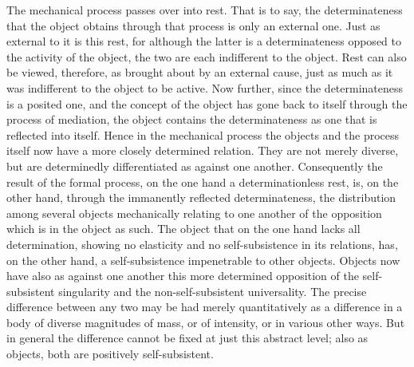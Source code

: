 The mechanical process passes over into rest.
That is to say, the determinateness that the object obtains
through that process is only an external one.
Just as external to it is this rest,
for although the latter is a determinateness
opposed to the activity of the object,
the two are each indifferent to the object.
Rest can also be viewed, therefore,
as brought about by an external cause,
just as much as it was indifferent to
the object to be active.
Now further, since the determinateness is a posited one,
and the concept of the object has gone back to itself
through the process of mediation,
the object contains the determinateness
as one that is reflected into itself.
Hence in the mechanical process the objects
and the process itself now
have a more closely determined relation.
They are not merely diverse,
but are determinedly differentiated as against one another.
Consequently the result of the formal process,
on the one hand a determinationless rest, is,
on the other hand, through
the immanently reflected determinateness,
the distribution among several objects
mechanically relating to one another
of the opposition which is in the object as such.
The object that on the one hand lacks all determination,
showing no elasticity and no self-subsistence in its relations,
has, on the other hand, a self-subsistence
impenetrable to other objects.
Objects now have also as against one another
this more determined opposition of
the self-subsistent singularity
and the non-self-subsistent universality.
The precise difference between any two may be
had merely quantitatively as a difference in
a body of diverse magnitudes of mass,
or of intensity, or in various other ways.
But in general the difference cannot be fixed
at just this abstract level;
also as objects, both are
positively self-subsistent.

